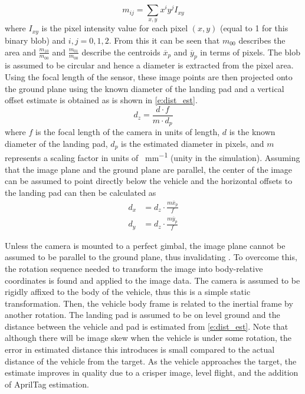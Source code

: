 \begin{equation}\label{e:im_moments} 
    m_{ij}=\sum_{x,y}x^iy^jI_{xy}
\end{equation}
where $I_{xy}$ is the pixel intensity value for each pixel $(x,y)$ (equal to 1 for this binary blob) and $i,j
= 0,1,2$. From this it can be seen that $m_{00}$ describes the area and $\frac{m_{10}}{m_{00}}$ and
$\frac{m_{01}}{m_{00}}$ describe the centroids $\overline{x}_p$ and $\overline{y}_p$ in terms of
pixels\cite{hu1962visual}. The blob is assumed to be circular and hence a diameter is extracted from the pixel
area. Using the focal length of the sensor, these image points are then projected onto the ground plane using
the known diameter of the landing pad and a vertical offset estimate is obtained as is shown in
\cref{e:dist_est}.
\begin{equation}\label{e:dist_est}
    d_z=\frac{d\cdot f}{m\cdot d_p}
\end{equation}
where $f$ is the focal length of the camera in units of length, $d$ is the known diameter of the landing pad,
$d_p$ is the estimated diameter in pixels, and $m$ represents a scaling factor in units of \si{\px\per\mm}
(unity in the simulation).
Assuming that the image plane and the ground plane are parallel, the center of the image can be assumed to
point directly below the vehicle and the horizontal offsets to the landing pad can then be calculated as
\begin{align}\label{e:horiz_est}
    d_x &= d_z\cdot\frac{m\overline{x}_p}{f}\\
    d_y &= d_z\cdot\frac{m\overline{y}_p}{f}\label{e:horiz_est-y}
\end{align}

Unless the camera is mounted to a perfect gimbal, the image plane cannot be assumed to be parallel to the
ground plane, thus invalidating . To overcome this, the rotation
sequence needed to transform the image into body-relative coordinates is found and applied to the image data.
The camera is assumed to be rigidly affixed to the body of the vehicle, thus this is a simple static
transformation. Then, the vehicle body frame is related to the inertial frame by another rotation. The landing
pad is assumed to be on level ground and the distance between the vehicle and pad is estimated from
\cref{e:dist_est}. Note that although there will be image skew when the vehicle is under some rotation, the error in estimated distance this introduces is small compared to the actual distance of the vehicle from
the target. As the vehicle approaches the target, the estimate improves in quality due to a crisper image,
level flight, and the addition of AprilTag estimation.

